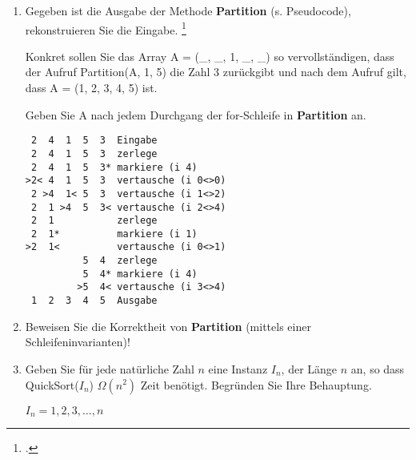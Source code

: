 \documentclass{bschlangaul-aufgabe}
\begin{document}

\let\O=\bO
\let\o=\bOmega
\let\T=\bT
\let\t=\bTheta

\begin{enumerate}


\item Gegeben ist die Ausgabe der Methode \textbf{Partition} (s.
Pseudocode), rekonstruieren Sie die Eingabe.
\footcite{examen:66115:2016:09}

Konkret sollen Sie das Array A = (\_, \_, 1, \_, \_) so
vervollständigen, dass der Aufruf Partition(A, 1, 5) die Zahl 3
zurückgibt und nach dem Aufruf gilt, dass A = (1, 2, 3, 4, 5) ist.

Geben Sie A nach jedem Durchgang der for-Schleife in \textbf{Partition}
an.

\begin{bAntwort}
\begin{verbatim}
 2  4  1  5  3  Eingabe
 2  4  1  5  3  zerlege
 2  4  1  5  3* markiere (i 4)
>2< 4  1  5  3  vertausche (i 0<>0)
 2 >4  1< 5  3  vertausche (i 1<>2)
 2  1 >4  5  3< vertausche (i 2<>4)
 2  1           zerlege
 2  1*          markiere (i 1)
>2  1<          vertausche (i 0<>1)
          5  4  zerlege
          5  4* markiere (i 4)
         >5  4< vertausche (i 3<>4)
 1  2  3  4  5  Ausgabe
\end{verbatim}
\end{bAntwort}


\item Beweisen Sie die Korrektheit von \textbf{Partition} (\zB mittels
einer Schleifeninvarianten)!


\item Geben Sie für jede natürliche Zahl $n$ eine Instanz $I_n$, der
Länge $n$ an, so dass QuickSort($I_n$) $\Omega(n^2)$ Zeit benötigt.
Begründen Sie Ihre Behauptung.

\begin{bAntwort}
$I_n = 1, 2, 3, \dots, n$


\end{bAntwort}
\end{enumerate}
\end{document}
